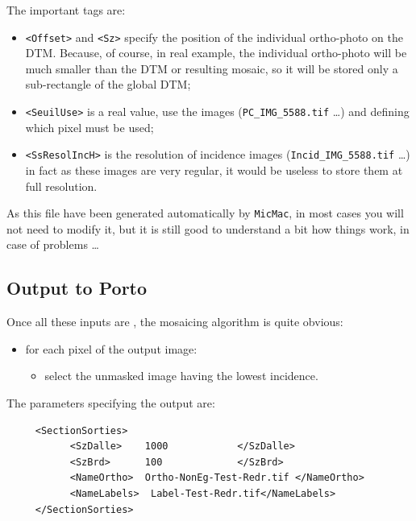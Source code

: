 The important tags are:

\begin{itemize}
   \item {\tt <Offset>} and {\tt <Sz>} specify the position of the individual ortho-photo
         on the DTM. Because, of course, in real example, the individual ortho-photo  will be much smaller
         than the DTM or resulting mosaic, so it will be stored only a sub-rectangle of the global DTM;

   \item {\tt <SeuilUse>} is a real value, use  the  images ({\tt PC\_IMG\_5588.tif} \dots) and
         defining which pixel must be used;

   \item {\tt <SsResolIncH>} is the resolution of incidence images ({\tt Incid\_IMG\_5588.tif} \dots)
         in fact as these images are very regular, it would be useless to store them at full resolution.

\end{itemize}


As this file have been generated automatically by {\tt MicMac}, in most cases you will
not need to modify it, but it is still good to understand a bit how things work,
in case of problems \dots



\subsection{Output to Porto}

Once  all these inputs are , %
the mosaicing
algorithm is quite obvious:

\begin{itemize}
     \item for each pixel of  the output image:
     \begin{itemize}
          \item select the unmasked image having the lowest incidence.
     \end{itemize}
\end{itemize}

The parameters specifying the output are:

{\scriptsize
\begin{verbatim}
     <SectionSorties>
           <SzDalle>    1000            </SzDalle>
           <SzBrd>      100             </SzBrd>
           <NameOrtho>  Ortho-NonEg-Test-Redr.tif </NameOrtho>
           <NameLabels>  Label-Test-Redr.tif</NameLabels>
     </SectionSorties>
\end{verbatim}
}


